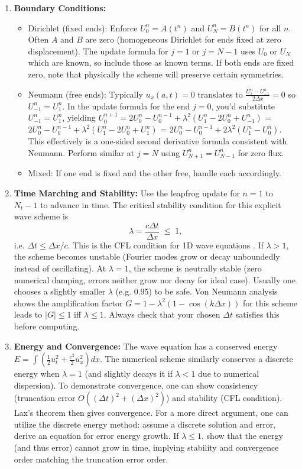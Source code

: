 \documentclass[a4paper,11pt]{article}
\begin{document}
\begin{enumerate}
\begin{itemize}
          \end{itemize}
    \item \textbf{Boundary Conditions:}
          \begin{itemize}
              \item Dirichlet (fixed ends): Enforce $U_0^n = A(t^n)$ and $U_N^n = B(t^n)$ for all $n$. Often $A$ and $B$ are zero (homogeneous Dirichlet for ends fixed at zero displacement). The update formula for $j=1$ or $j=N-1$ uses $U_0$ or $U_N$ which are known, so include those as known terms. If both ends are fixed zero, note that physically the scheme will preserve certain symmetries.
              \item Neumann (free ends): Typically $u_x(a,t)=0$ translates to $\frac{U_1^n - U_{-1}^n}{2\Delta x}=0$ so $U_{-1}^n = U_1^n$. In the update formula for the end $j=0$, you’d substitute $U_{-1}^n = U_1^n$, yielding $U_0^{n+1} = 2U_0^n - U_0^{n-1} + \lambda^2 (U_1^n - 2U_0^n + U_{-1}^n)$ = $2U_0^n - U_0^{n-1} + \lambda^2 (U_1^n - 2U_0^n + U_1^n)$ = $2U_0^n - U_0^{n-1} + 2\lambda^2 (U_1^n - U_0^n)$. This effectively is a one-sided second derivative formula consistent with Neumann. Perform similar at $j=N$ using $U_{N+1}^n = U_{N-1}^n$ for zero flux.
              \item Mixed: If one end is fixed and the other free, handle each accordingly.
          \end{itemize}
    \item \textbf{Time Marching and Stability:} Use the leapfrog update for $n=1$ to $N_t-1$ to advance in time. The critical stability condition for this explicit wave scheme is
          $$\lambda = \frac{c\Delta t}{\Delta x} \;\le\; 1,$$
          i.e. $\Delta t \le \Delta x/c$. This is the CFL condition for 1D wave equations . If $\lambda>1$, the scheme becomes unstable (Fourier modes grow or decay unboundedly instead of oscillating). At $\lambda=1$, the scheme is neutrally stable (zero numerical damping, errors neither grow nor decay for ideal case). Usually one chooses a slightly smaller $\lambda$ (e.g. 0.95) to be safe. Von Neumann analysis shows the amplification factor $G = 1 - \lambda^2(1-\cos(k\Delta x))$ for this scheme leads to $|G| \le 1$ iff $\lambda \le 1$. Always check that your chosen $\Delta t$ satisfies this before computing.
    \item \textbf{Energy and Convergence:} The wave equation has a conserved energy $E = \int (\frac{1}{2}u_t^2 + \frac{c^2}{2}u_x^2)dx$. The numerical scheme similarly conserves a discrete energy when $\lambda=1$ (and slightly decays it if $\lambda<1$ due to numerical dispersion). To demonstrate convergence, one can show consistency (truncation error $O((\Delta t)^2 + (\Delta x)^2)$) and stability (CFL condition). Lax’s theorem then gives convergence. For a more direct argument, one can utilize the discrete energy method: assume a discrete solution and error, derive an equation for error energy growth. If $\lambda\le1$, show that the energy (and thus error) cannot grow in time, implying stability and convergence order matching the truncation error order.
\end{enumerate}
\end{document}
